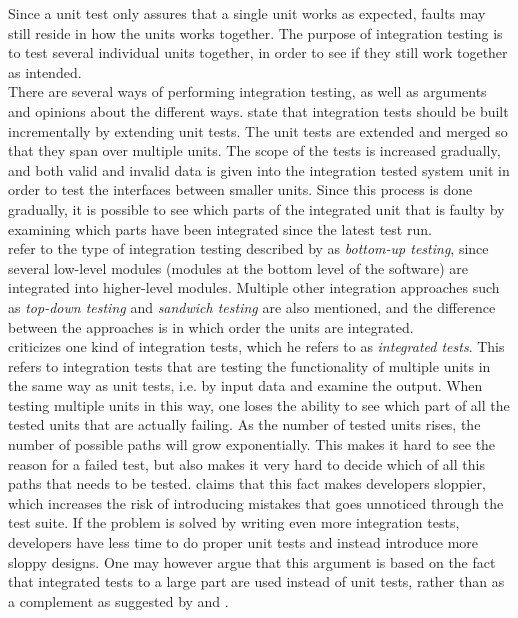 Since a unit test only assures that a single unit works as expected,
faults may still reside in how the units works together. The purpose of
integration testing is to test several individual units together, in
order to see if they still work together as intended.\\

There are several ways of performing integration testing, as well as
arguments and opinions about the different ways. \citet{book:adp} state
that integration tests should be built incrementally by extending unit
tests. The unit tests are extended and merged so that they span over
multiple units. The scope of the tests is increased gradually, and both
valid and invalid data is given into the integration tested system unit
in order to test the interfaces between smaller units. Since this
process is done gradually, it is possible to see which parts of the
integrated unit that is faulty by examining which parts have been
integrated since the latest test run.\\

\citet{book:pfleeger} refer to the type of integration testing described
by \citeauthor{book:adp} as \emph{bottom-up testing}, since several
low-level modules (modules at the bottom level of the software) are
integrated into higher-level modules. Multiple other integration
approaches such as \emph{top-down testing} and \emph{sandwich testing}
are also mentioned, and the difference between the approaches is in which
order the units are integrated.\\

\citet{video:integrated_scam} criticizes one kind of integration tests,
which he refers to as \emph{integrated tests}. This refers to
integration tests that are testing the functionality of multiple units
in the same way as unit tests, i.e. by input data and examine the
output. When testing multiple units in this way, one loses the ability
to see which part of all the tested units that are actually failing. As
the number of tested units rises, the number of possible paths will grow
exponentially. This makes it hard to see the reason for a failed test,
but also makes it very hard to decide which of all this paths that needs
to be tested. \citeauthor{video:integrated_scam} claims that this fact
makes developers sloppier, which increases the risk of introducing
mistakes that goes unnoticed through the test suite. If the problem is
solved by writing even more integration tests, developers have less time
to do proper unit tests and instead introduce more sloppy designs. One
may however argue that this argument is based on the fact that
integrated tests to a large part are used instead of unit tests, rather
than as a complement as suggested by \citeauthor{book:pfleeger} and
\citeauthor{book:adp}.\\

